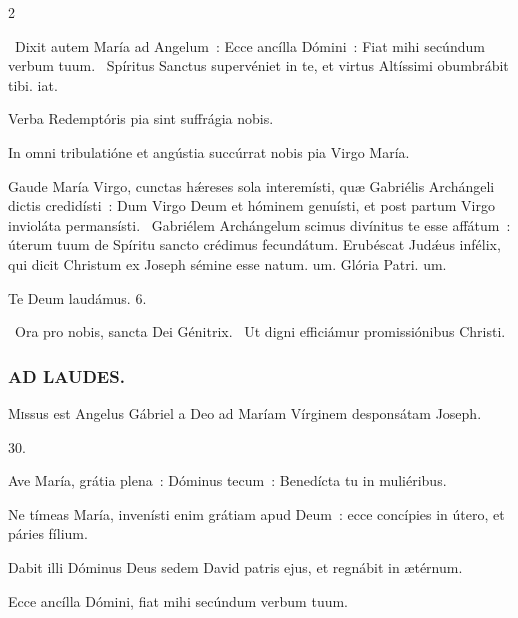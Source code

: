 \documentclass[9pt,twoside]{extarticle}
\begin{document}
\begin{multicols}{2}
\begin{tightlist}{}
\item {}~Dixit autem María ad Angelum~: Ecce ancílla Dómini~: \textred{*} Fiat mihi secúndum verbum tuum. ~Spíritus Sanctus supervéniet in te, et virtus Altíssimi obumbrábit tibi. iat.
\item {} Verba Redemptóris pia sint suffrágia nobis.
\item {} In omni tribulatióne et angústia succúrrat nobis pia Virgo María.
\item {} Gaude María Virgo, cunctas hǽreses sola interemísti, quæ Gabriélis Archángeli dictis credidísti~: \textred{*} Dum Virgo Deum et hóminem genuísti, et post partum Virgo invioláta permansísti. ~Gabriélem Archángelum scimus divínitus te esse affátum~: úterum tuum de Spíritu sancto crédimus fecundátum. Erubéscat Judǽus infélix, qui dicit Christum ex Joseph sémine esse natum. um. Glória Patri. um.
\item Te Deum laudámus. 6.
\item {}~Ora pro nobis, sancta Dei Génitrix. ~Ut digni efficiámur promissiónibus Christi.
\end{tightlist}

\subsubsection*{\center \textsc{AD LAUDES.}}
\begin{center}\end{center}
\lettrine{M}issus est Angelus Gábriel a Deo ad Maríam Vírginem desponsátam Joseph.

\begin{tightlist}{}
\item {} 30.
\item {} Ave María, grátia plena~: Dóminus tecum~: Benedícta tu in muliéribus.
\item {} Ne tímeas María, invenísti enim grátiam apud Deum~: ecce concípies in útero, et páries fílium.
\item {} Dabit illi Dóminus Deus sedem David patris ejus, et regnábit in ætérnum.
\item {} Ecce ancílla Dómini, fiat mihi secúndum verbum tuum.
\end{tightlist}


\end{multicols}
\end{document}
